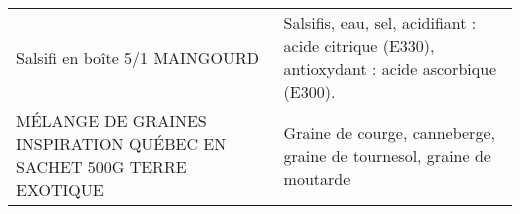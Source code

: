 \begin{longtable}{p{5cm}p{10cm}}
                                                                           Salsifi en boîte 5/1 MAINGOURD &                                                                                                                                                                                                                                                                                                                                                                                                                                                                                                                                                                                                                                                                                                                                                                                                                                                                                                                                           Salsifis, eau, sel, acidifiant : acide citrique (E330), antioxydant : acide ascorbique (E300). \\
                                      MÉLANGE DE GRAINES INSPIRATION QUÉBEC EN SACHET 500G TERRE EXOTIQUE &                                                                                                                                                                                                                                                                                                                                                                                                                                                                                                                                                                                                                                                                                                                                                                                                                                                                                                                                                                    Graine de courge, canneberge, graine de tournesol, graine de moutarde \\

\end{longtable}
